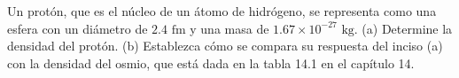 \item Un protón, que es el núcleo de un átomo de hidrógeno, se representa como una esfera con un diámetro de $2.4 \text{ fm}$ y una masa de $1.67 \times 10^{-27} \text{ kg}$. (a) Determine la densidad del protón. (b) Establezca cómo se compara su respuesta del inciso (a) con la densidad del osmio, que está dada en la tabla 14.1 en el capítulo 14.
